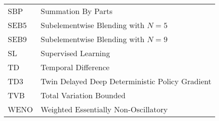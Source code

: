 \begin{tabular}{ll}
  SBP     & Summation By Parts\\
  \vspace{1mm}
  SEB5     & Subelementwise Blending with $N=5$\\
  \vspace{1mm}
  SEB9     &  Subelementwise Blending with $N=9$\\
  \vspace{1mm}
  SL     & Supervised Learning\\
  \vspace{1mm}
  TD     & Temporal Difference\\
  \vspace{1mm}
  TD3     & Twin Delayed Deep Deterministic Policy Gradient\\ 
  \vspace{1mm}
  TVB      & Total Variation Bounded\\
  \vspace{1mm}
  WENO      & Weighted Essentially Non-Oscillatory\\
\end{tabular}

